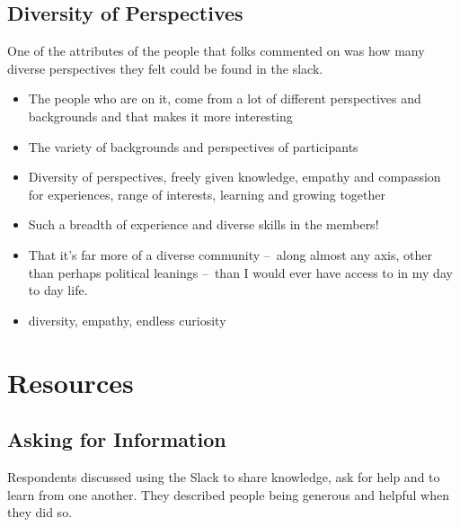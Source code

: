 \documentclass[
]{book}
\providecommand{\tightlist}{%
  \setlength{\itemsep}{0pt}\setlength{\parskip}{0pt}}
\begin{document}
\subsection{Diversity of Perspectives}\label{diversity-of-perspectives}

One of the attributes of the people that folks commented on was how many diverse perspectives they felt could be found in the slack.

\begin{itemize}
\tightlist
\item
  The people who are on it, come from a lot of different perspectives and backgrounds and that makes it more interesting
\item
  The variety of backgrounds and perspectives of participants
\item
  Diversity of perspectives, freely given knowledge, empathy and compassion for experiences, range of interests, learning and growing together
\item
  Such a breadth of experience and diverse skills in the members!
\item
  That it's far more of a diverse community --~along almost any axis, other than perhaps political leanings --~than I would ever have access to in my day to day life.
\item
  diversity, empathy, endless curiosity
\end{itemize}

\section{Resources}\label{resources}

\subsection{Asking for Information}\label{asking-for-information}

Respondents discussed using the Slack to share knowledge, ask for help and to learn from one another. They described people being generous and helpful when they did so.
\end{document}
